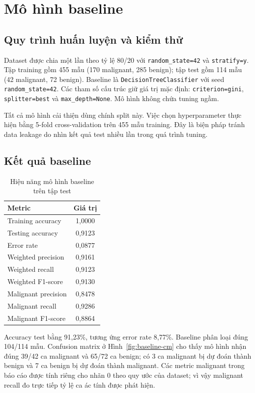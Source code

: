 \chapter{Mô hình baseline}
\label{chap:baseline}

\section{Quy trình huấn luyện và kiểm thử}

Dataset được chia một lần theo tỷ lệ 80/20 với
\texttt{random\_state=42} và \texttt{stratify=y}. Tập training gồm 455 mẫu
(170 malignant, 285 benign); tập test gồm 114 mẫu (42 malignant, 72 benign).
Baseline là \texttt{DecisionTreeClassifier} với seed
\texttt{random\_state=42}. Các tham số cấu trúc giữ giá trị mặc định:
\texttt{criterion=gini}, \texttt{splitter=best} và
\texttt{max\_depth=None}. Mô hình không chứa tuning ngầm.

Tất cả mô hình cải thiện dùng chính split này. Việc chọn hyperparameter thực
hiện bằng 5-fold cross-validation trên 455 mẫu training. Đây là biện pháp tránh
data leakage do nhìn kết quả test nhiều lần trong quá trình tuning.

\section{Kết quả baseline}

\begin{table}[H]
\centering
\caption{Hiệu năng mô hình baseline trên tập test}
\label{tab:baseline-metrics}
\begin{tabular}{lc}
\toprule
Metric & Giá trị \\
\midrule
Training accuracy & 1,0000 \\
Testing accuracy & 0,9123 \\
Error rate & 0,0877 \\
Weighted precision & 0,9161 \\
Weighted recall & 0,9123 \\
Weighted F1-score & 0,9130 \\
Malignant precision & 0,8478 \\
Malignant recall & 0,9286 \\
Malignant F1-score & 0,8864 \\
\bottomrule
\end{tabular}
\end{table}

Accuracy test bằng 91,23\%, tương ứng error rate 8,77\%. Baseline phân loại
đúng 104/114 mẫu. Confusion matrix ở Hình~\ref{fig:baseline-cm} cho thấy mô
hình nhận đúng 39/42 ca malignant và 65/72 ca benign; có 3 ca malignant bị dự
đoán thành benign và 7 ca benign bị dự đoán thành malignant.
Các metric malignant trong báo cáo được tính riêng cho nhãn 0 theo quy ước của
dataset; vì vậy malignant recall đo trực tiếp tỷ lệ ca ác tính được phát hiện.

